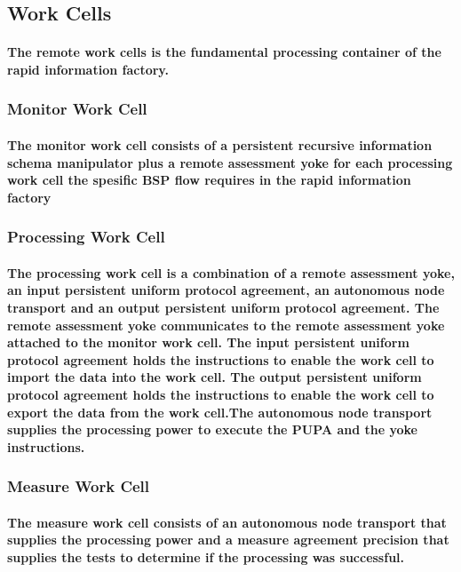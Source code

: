 \documentclass{acm_proc_article-sp}
\begin{document}
\subsection{Work Cells}
\paragraph{The remote work cells is the fundamental processing container of the rapid information factory.}
\subsubsection{Monitor Work Cell}
\paragraph{The monitor work cell consists of a persistent recursive information schema manipulator plus a remote assessment yoke for each processing work cell the spesific BSP flow requires in the rapid information factory}
\subsubsection{Processing Work Cell}
\paragraph{The processing work cell is a combination of a remote assessment yoke, an input persistent uniform protocol agreement, an autonomous node transport and an output persistent uniform protocol agreement. The remote assessment yoke communicates to the remote assessment yoke attached to the monitor work cell. The input persistent uniform protocol agreement holds the instructions to enable the work cell to import the data into the work cell. The output persistent uniform protocol agreement holds the instructions to enable the work cell to export the data from the work cell.The autonomous node transport supplies the processing power to execute the PUPA and the yoke instructions.}
\subsubsection{Measure Work Cell}
\paragraph{The measure work cell consists of an autonomous node transport that supplies the processing power and a measure agreement precision that supplies the tests to determine if the processing was successful.}
\pagebreak
\end{document}
